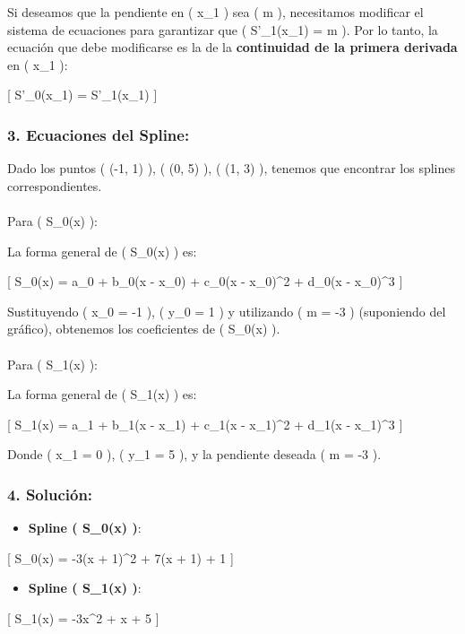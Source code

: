 \documentclass[
  letterpaper,
  DIV=11,
  numbers=noendperiod]{scrartcl}
\makeatletter
\let\oldparagraph\paragraph
\renewcommand{\paragraph}{
    \@ifstar
      \xxxParagraphStar
      \xxxParagraphNoStar
  }
\newcommand{\xxxParagraphStar}[1]{\oldparagraph*{#1}\mbox{}}
\newcommand{\xxxParagraphNoStar}[1]{\oldparagraph{#1}\mbox{}}
\providecommand{\tightlist}{%
  \setlength{\itemsep}{0pt}\setlength{\parskip}{0pt}}\usepackage{longtable,booktabs,array}
\makeatother
\begin{document}
Si deseamos que la pendiente en ( x\_1 ) sea ( m ), necesitamos
modificar el sistema de ecuaciones para garantizar que ( S'\_1(x\_1) = m
). Por lo tanto, la ecuación que debe modificarse es la de la
\textbf{continuidad de la primera derivada} en ( x\_1 ):

{[} S'\_0(x\_1) = S'\_1(x\_1) {]}

\subsubsection{3. Ecuaciones del Spline:}\label{ecuaciones-del-spline}

Dado los puntos ( (-1, 1) ), ( (0, 5) ), ( (1, 3) ), tenemos que
encontrar los splines correspondientes.

\paragraph{Para ( S\_0(x) ):}\label{para-s_0x}

La forma general de ( S\_0(x) ) es:

{[} S\_0(x) = a\_0 + b\_0(x - x\_0) + c\_0(x - x\_0)\^{}2 + d\_0(x -
x\_0)\^{}3 {]}

Sustituyendo ( x\_0 = -1 ), ( y\_0 = 1 ) y utilizando ( m = -3 )
(suponiendo del gráfico), obtenemos los coeficientes de ( S\_0(x) ).

\paragraph{Para ( S\_1(x) ):}\label{para-s_1x}

La forma general de ( S\_1(x) ) es:

{[} S\_1(x) = a\_1 + b\_1(x - x\_1) + c\_1(x - x\_1)\^{}2 + d\_1(x -
x\_1)\^{}3 {]}

Donde ( x\_1 = 0 ), ( y\_1 = 5 ), y la pendiente deseada ( m = -3 ).

\subsubsection{4. Solución:}\label{soluciuxf3n}

\begin{itemize}
\tightlist
\item
  \textbf{Spline ( S\_0(x) )}:
\end{itemize}

{[} S\_0(x) = -3(x + 1)\^{}2 + 7(x + 1) + 1 {]}

\begin{itemize}
\tightlist
\item
  \textbf{Spline ( S\_1(x) )}:
\end{itemize}

{[} S\_1(x) = -3x\^{}2 + x + 5 {]}
\end{document}
